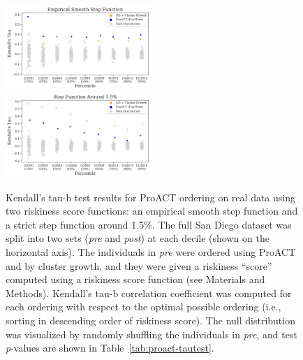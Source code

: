 \begin{figure} %
\centering
\includegraphics[width=0.495\textwidth]{figs/proact-tautest-smooth}
\includegraphics[width=0.495\textwidth]{figs/proact-tautest-strict}
\caption[Kendall's Tau-b Test \textit{p}-Values (Step Functions)]
{Kendall's tau-b test results for ProACT ordering on real data using two riskiness score functions: an empirical smooth step function and a strict step function around 1.5\%. The full San Diego dataset was split into two sets (\textit{pre} and \textit{post}) at each decile (shown on the horizontal axis). The individuals in \textit{pre} were ordered using ProACT and by cluster growth, and they were given a riskiness ``score'' computed using a riskiness score function (see Materials and Methods). Kendall's tau-b correlation coefficient was computed for each ordering with respect to the optimal possible ordering (i.e., sorting in descending order of riskiness score). The null distribution was visualized by randomly shuffling the individuals in \textit{pre}, and test \textit{p}-values are shown in Table~\ref{tab:proact-tautest}.}
\label{fig:proact-tautest}
\end{figure}

